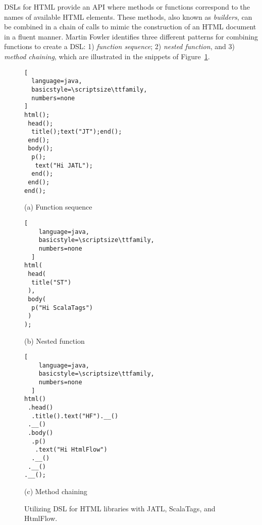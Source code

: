 DSLs for HTML provide an API where methods or functions correspond to the names
of available HTML elements. These methods, also known as \textit{builders}, can
be combined in a chain of calls to mimic the construction of an HTML document
in a fluent manner. Martin Fowler\cite{dslbook} identifies three different
patterns for combining functions to create a DSL: 1) \textit{function
  sequence}; 2) \textit{nested function}, and 3) \textit{method chaining}, which
are illustrated in the snippets of Figure~\ref{fig:dsl-idioms}.
\begin{figure}[h]
  \centering

\begin{minipage}[c]{0.33\linewidth}
  \centering
  \begin{lstlisting}[
  language=java,
  basicstyle=\scriptsize\ttfamily,
  numbers=none
]
html();
 head();
  title();text("JT");end();
 end();
 body();
  p();
   text("Hi JATL");
  end();
 end();
end();
  \end{lstlisting}
    \caption*{(a) Function sequence}
  \end{minipage}
  \hfil
  \begin{minipage}[c]{0.23\linewidth}
    \centering
    \begin{lstlisting}[
    language=java,
    basicstyle=\scriptsize\ttfamily,
    numbers=none
  ]
html(
 head(
  title("ST")
 ),
 body(
  p("Hi ScalaTags")
 )
);
  \end{lstlisting}
    \caption*{(b) Nested function}
  \end{minipage}
  \hfil
  \begin{minipage}[c]{0.32\linewidth}
    \centering
    \begin{lstlisting}[
    language=java,
    basicstyle=\scriptsize\ttfamily,
    numbers=none
  ]
html()
 .head()
  .title().text("HF").__()
 .__()
 .body()
  .p()
   .text("Hi HtmlFlow")
  .__()
 .__()
.__();
  \end{lstlisting}
    \caption*{(c) Method chaining}
  \end{minipage}

  \caption{Utilizing DSL for HTML libraries with JATL, ScalaTags, and HtmlFlow.}
  \label{fig:dsl-idioms}
\end{figure}

